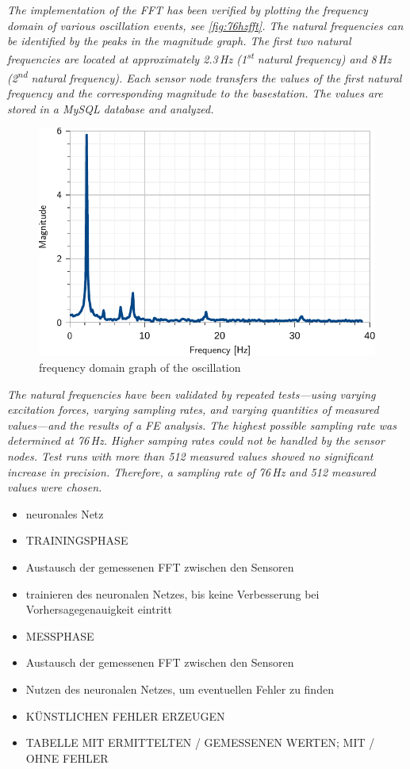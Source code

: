 \documentclass[12pt,a4paper]{scrartcl}
\begin{document}
\textit{The implementation of the FFT has been verified by plotting the frequency domain of various oscillation events, see \autoref{fig:76hzfft}.
The natural frequencies can be identified by the peaks in the magnitude graph.
The first two natural frequencies are located at approximately 2.3\,Hz (1\textsuperscript{st} natural frequency) and 8\,Hz (2\textsuperscript{nd} natural frequency).
Each sensor node transfers the values of the first natural frequency and the corresponding magnitude to the basestation. 
The values are stored in a MySQL database and analyzed.}

\begin{figure}[htb]
    \centering
    \includegraphics[scale=0.9]{figures/76HzHalf.pdf}
    \caption{frequency domain graph of the oscillation}
    \label{fig:76hzfft}
\end{figure}

\textit{The natural frequencies have been validated by repeated tests---using varying excitation forces, varying sampling rates, and varying quantities of measured values---and the results of a FE analysis.
The highest possible sampling rate was determined at 76\,Hz.
Higher samping rates could not be handled by the sensor nodes.
Test runs with more than 512 measured values showed no significant increase in precision.
Therefore, a sampling rate of 76\,Hz and 512 measured values were chosen.}

\begin{itemize}
\item neuronales Netz
\item TRAININGSPHASE
\item Austausch der gemessenen FFT zwischen den Sensoren
\item trainieren des neuronalen Netzes, bis keine Verbesserung bei Vorhersagegenauigkeit eintritt
\item MESSPHASE
\item Austausch der gemessenen FFT zwischen den Sensoren
\item Nutzen des neuronalen Netzes, um eventuellen Fehler zu finden
\item KÜNSTLICHEN FEHLER ERZEUGEN
\item TABELLE MIT ERMITTELTEN / GEMESSENEN WERTEN; MIT / OHNE FEHLER
\end{itemize}
\end{document}
